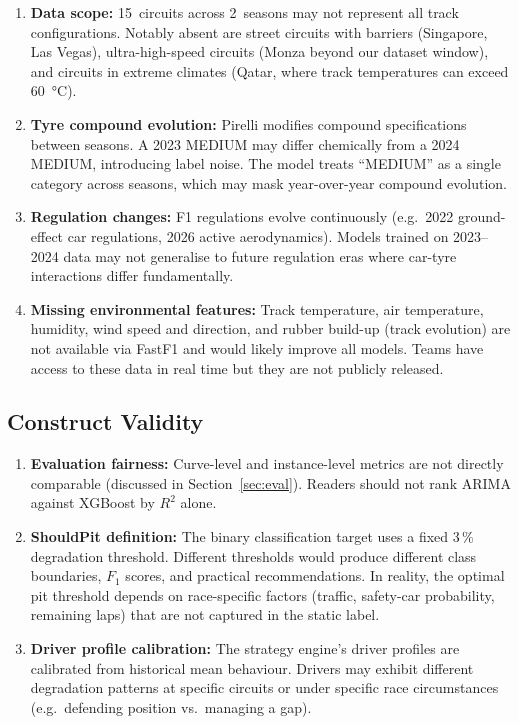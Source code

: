 \documentclass[journal,twoside]{IEEEtran}
\begin{document}
\begin{enumerate}
  \item \textbf{Data scope:}  15~circuits across 2~seasons may not
  represent all track configurations.  Notably absent are street circuits
  with barriers (Singapore, Las Vegas), ultra-high-speed circuits
  (Monza beyond our dataset window), and circuits in extreme climates
  (Qatar, where track temperatures can exceed \SI{60}{\celsius}).

  \item \textbf{Tyre compound evolution:}  Pirelli modifies compound
  specifications between seasons.  A 2023 MEDIUM may differ chemically
  from a 2024 MEDIUM, introducing label noise.  The model treats
  ``MEDIUM'' as a single category across seasons, which may mask
  year-over-year compound evolution.

  \item \textbf{Regulation changes:}  F1 regulations evolve
  continuously (e.g.\ 2022 ground-effect car regulations, 2026 active
  aerodynamics).  Models trained on 2023--2024 data may not generalise
  to future regulation eras where car-tyre interactions differ
  fundamentally.

  \item \textbf{Missing environmental features:}  Track temperature,
  air temperature, humidity, wind speed and direction, and rubber
  build-up (track evolution) are not available via FastF1 and would
  likely improve all models.  Teams have access to these data in real
  time but they are not publicly released.
\end{enumerate}

\subsection{Construct Validity}

\begin{enumerate}
  \item \textbf{Evaluation fairness:}  Curve-level and instance-level
  metrics are not directly comparable (discussed in
  Section~\ref{sec:eval}).  Readers should not rank ARIMA against
  XGBoost by $R^{2}$ alone.

  \item \textbf{ShouldPit definition:}  The binary classification
  target uses a fixed 3\,\% degradation threshold.  Different thresholds
  would produce different class boundaries, $F_{1}$ scores, and
  practical recommendations.  In reality, the optimal pit threshold
  depends on race-specific factors (traffic, safety-car probability,
  remaining laps) that are not captured in the static label.

  \item \textbf{Driver profile calibration:}  The strategy engine's
  driver profiles are calibrated from historical mean behaviour.
  Drivers may exhibit different degradation patterns at specific
  circuits or under specific race circumstances (e.g.\ defending
  position vs.\ managing a gap).
\end{enumerate}
\end{document}
